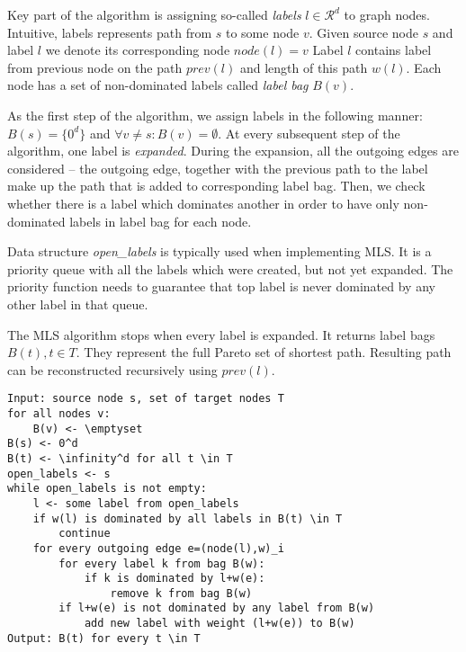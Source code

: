 Key part of the algorithm is assigning so-called \emph{labels} $l\in \mathcal{R}^d$ to graph nodes.
Intuitive, labels represents path from $s$ to some node $v$.
Given source node $s$ and label $l$ we denote its corresponding node $node(l)=v$
Label $l$ contains label from previous node on the path $prev(l)$ and length of this path $w(l)$.
Each node has a set of non-dominated labels called \emph{label bag} $B(v)$.

As the first step of the algorithm, we assign labels in the following manner: $B(s)=\{0^d\}$ and $\forall v \ne s: B(v)=\emptyset$.
At every subsequent step of the algorithm, one label is \emph{expanded}. 
During the expansion, all the outgoing edges are considered -- the outgoing edge, together with the previous path to the label make up the path that is added to corresponding label bag. 
Then, we check whether there is a label which dominates another in order to have only non-dominated labels in label bag for
each node.

Data structure {\em open\_labels} is typically used when implementing MLS. It is a priority queue with all the labels which were created, but not yet expanded. The priority function needs to guarantee that top label is never dominated by any other label in that queue.

The MLS algorithm stops when every label is expanded. It returns label bags $B(t), t \in T$. 
They represent the full Pareto set of shortest path. 
Resulting path can be reconstructed recursively using $prev(l)$.

\renewcommand{\lstlistingname}{Pseudocode} 
\begin{lstlisting}[caption={MLS Algorithm},label=MLSalg,captionpos=t,float,abovecaptionskip=-\medskipamount]
Input: source node s, set of target nodes T
for all nodes v:
	B(v) <- \emptyset
B(s) <- 0^d
B(t) <- \infinity^d for all t \in T
open_labels <- s
while open_labels is not empty:
	l <- some label from open_labels
    if w(l) is dominated by all labels in B(t) \in T
    	continue
    for every outgoing edge e=(node(l),w)_i
    	for every label k from bag B(w):
        	if k is dominated by l+w(e):
            	remove k from bag B(w)
        if l+w(e) is not dominated by any label from B(w)
        	add new label with weight (l+w(e)) to B(w)
Output: B(t) for every t \in T
\end{lstlisting}

